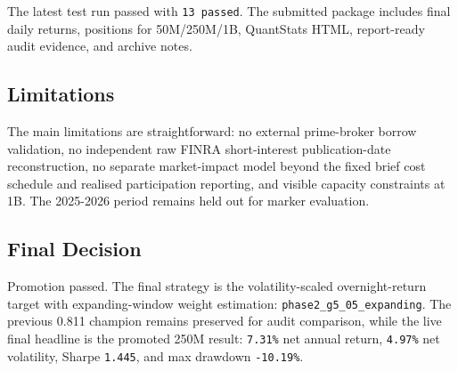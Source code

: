 \documentclass[
  10pt,
]{article}
\begin{document}
The latest test run passed with \texttt{13\ passed}. The submitted
package includes final daily returns, positions for 50M/250M/1B,
QuantStats HTML, report-ready audit evidence, and archive notes.

\hypertarget{limitations}{%
\subsection{Limitations}\label{limitations}}

The main limitations are straightforward: no external prime-broker
borrow validation, no independent raw FINRA short-interest
publication-date reconstruction, no separate market-impact model beyond
the fixed brief cost schedule and realised participation reporting, and
visible capacity constraints at 1B. The 2025-2026 period remains held
out for marker evaluation.

\hypertarget{final-decision}{%
\subsection{Final Decision}\label{final-decision}}

Promotion passed. The final strategy is the volatility-scaled
overnight-return target with expanding-window weight estimation:
\texttt{phase2\_g5\_05\_expanding}. The previous 0.811 champion remains
preserved for audit comparison, while the live final headline is the
promoted 250M result: \texttt{7.31\%} net annual return, \texttt{4.97\%}
net volatility, Sharpe \texttt{1.445}, and max drawdown
\texttt{-10.19\%}.
\end{document}

